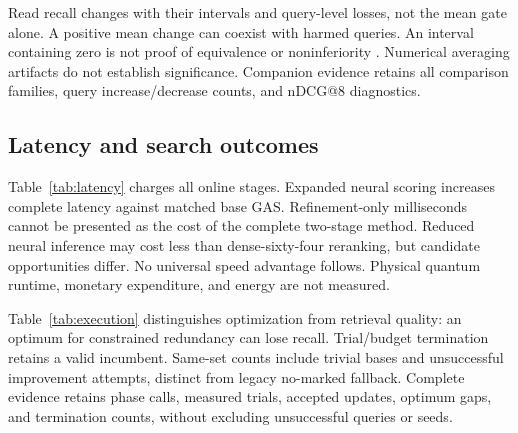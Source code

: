 \documentclass[conference]{IEEEtran}
\newcommand{\resultinput}[1]{}
\begin{document}
\begin{table}[t]
\centering\small\setlength{\tabcolsep}{5pt}
\caption{Reported GAS minus matched base; $^*$earlier FiQA base minus L6-only. Pointwise 95\% CIs; full Holm families.}
\label{tab:statistics}
\resultinput{statistics.tex}
\end{table}

Read recall changes with their intervals and query-level losses, not the mean gate alone. A positive mean change can coexist with harmed queries. An interval containing zero is not proof of equivalence or noninferiority \cite{dror2018harnessing}. Numerical averaging artifacts do not establish significance. Companion evidence retains all comparison families, query increase/decrease counts, and nDCG@8 diagnostics.

\subsection{Latency and search outcomes}
Table~\ref{tab:latency} charges all online stages. Expanded neural scoring increases complete latency against matched base GAS. Refinement-only milliseconds cannot be presented as the cost of the complete two-stage method. Reduced neural inference may cost less than dense-sixty-four reranking, but candidate opportunities differ. No universal speed advantage follows. Physical quantum runtime, monetary expenditure, and energy are not measured.

\begin{table}[t]
\centering\small\setlength{\tabcolsep}{6pt}
\caption{Composed online latency in milliseconds per seeded request. P50/P95 include applicable retrieval, lexical, neural, and selection stages; loading/warm-up are separate. Compare within a dataset/run, not sessions as matched speed experiments.}
\label{tab:latency}
\resultinput{latency.tex}
\end{table}

\begin{table}[t]
\centering\small\setlength{\tabcolsep}{4pt}
\caption{Requests and mean base/refinement phase calls (base-only shows 0/base). Hit: exact float-redundancy optimum for refinement, exact integer optimum for base-only. Same set: retained base membership. S50/S95: combined selector ms, excluding inference. Legacy fallback counts have their own request denominator.}
\label{tab:execution}
\resultinput{execution.tex}
\end{table}

Table~\ref{tab:execution} distinguishes optimization from retrieval quality: an optimum for constrained redundancy can lose recall. Trial/budget termination retains a valid incumbent. Same-set counts include trivial bases and unsuccessful improvement attempts, distinct from legacy no-marked fallback. Complete evidence retains phase calls, measured trials, accepted updates, optimum gaps, and termination counts, without excluding unsuccessful queries or seeds.
\end{document}
